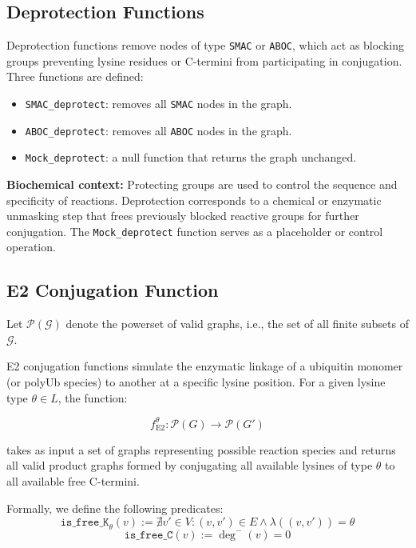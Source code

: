 \documentclass[12pt]{article}
\begin{document}
\subsection{Deprotection Functions}

Deprotection functions remove nodes of type \texttt{SMAC} or \texttt{ABOC}, which act as blocking groups preventing lysine residues or C-termini from participating in conjugation. Three functions are defined:

\begin{itemize}
    \item \texttt{SMAC\_deprotect}: removes all \texttt{SMAC} nodes in the graph.
    \item \texttt{ABOC\_deprotect}: removes all \texttt{ABOC} nodes in the graph.
    \item \texttt{Mock\_deprotect}: a null function that returns the graph unchanged.
\end{itemize}

\textbf{Biochemical context:} Protecting groups are used to control the sequence and specificity of reactions. Deprotection corresponds to a chemical or enzymatic unmasking step that frees previously blocked reactive groups for further conjugation. The \texttt{Mock\_deprotect} function serves as a placeholder or control operation.


%
 \subsection{E2 Conjugation Function}

Let $\mathcal{P}(\mathcal{G})$ denote the powerset of valid graphs, i.e., the set of all finite subsets of $\mathcal{G}$.

E2 conjugation functions simulate the enzymatic linkage of a ubiquitin monomer (or polyUb species) to another at a specific lysine position. For a given lysine type $\theta \in L$, the function:

\begin{equation*}
f^\theta_{\text{E2}} : \mathcal{P}(G) \to \mathcal{P}(G')
\end{equation*}

takes as input a set of graphs representing possible reaction species and returns all valid product graphs formed by conjugating all available lysines of type $\theta$ to all available free C-termini.

\vspace{0.5em}
Formally, we define the following predicates:
\[
\texttt{is\_free\_K}_\theta(v) := \nexists v' \in V : (v, v') \in E \land \lambda((v, v')) = \theta
\]
\[
\texttt{is\_free\_C}(v) := \deg^-(v) = 0
\]
\end{document}
